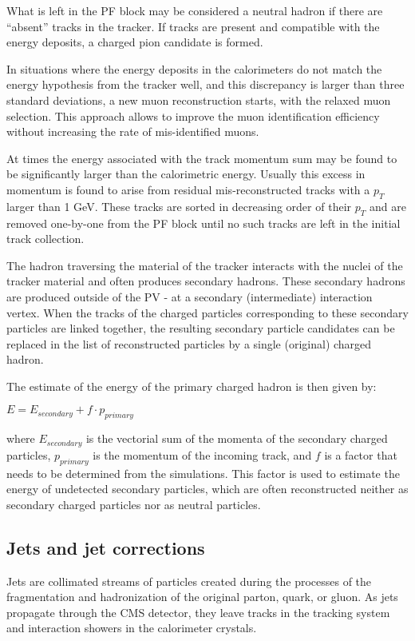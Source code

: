 What is left in the PF block may be considered a neutral hadron if there are ``absent'' tracks in the tracker. If tracks are present and compatible with the  energy deposits, a charged pion candidate is formed. 

In situations where the energy deposits in the calorimeters do not match the energy hypothesis from the tracker well, and this discrepancy is larger than three standard deviations, a new muon reconstruction starts, with the relaxed muon selection. This approach allows to improve the muon identification efficiency without increasing the rate of mis-identified muons. 

At times the energy associated with the track momentum sum may be found to be significantly larger than the calorimetric energy. Usually this excess in momentum is found to arise from residual mis-reconstructed tracks with a $p_T$ larger than 1 GeV. These tracks are sorted in decreasing order of their $p_T$ and are removed one-by-one from the PF block until no such tracks are left in the initial track collection.

The hadron traversing the material of the tracker interacts with the nuclei of the tracker material and often produces secondary hadrons. These secondary hadrons are produced outside of the PV - at a secondary (intermediate) interaction vertex. When the tracks of the charged particles corresponding to these secondary particles are linked together, the resulting secondary particle candidates can be  replaced in the list of reconstructed particles by a single (original) charged hadron.  

The estimate of the energy of the primary charged hadron is then given by:

$E = E_{secondary} + f \cdot p_{primary}$

\noindent where $E_{secondary}$ is the vectorial sum of the momenta of the secondary charged particles, $p_{primary}$ is the momentum of the incoming track, and $f$ is a factor that needs to be determined from the simulations. This factor is used to estimate the energy of undetected secondary particles, which are often reconstructed neither as secondary charged particles nor as neutral particles.

\subsection{Jets and jet corrections}\label{sec:jets}

Jets are collimated streams of particles created during the processes of the fragmentation and hadronization of the original parton, quark, or gluon. As jets propagate through the CMS detector, they leave tracks in the tracking system and interaction showers in the calorimeter crystals. 

